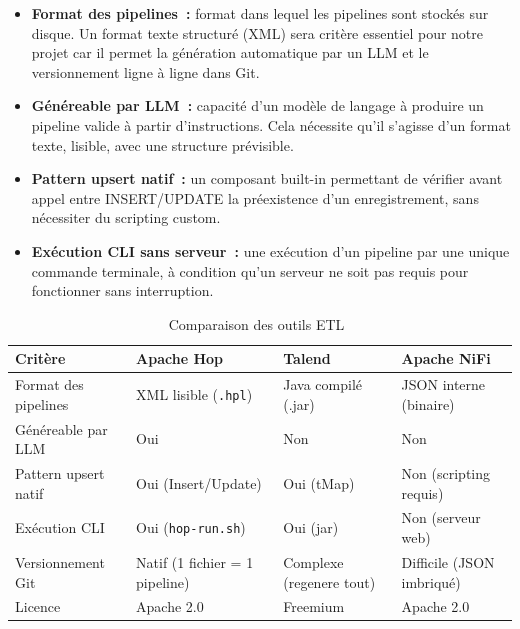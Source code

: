 \begin{itemize}
    \item \textbf{Format des pipelines~:} format dans lequel les pipelines sont stockés sur disque. Un format texte structuré (XML) sera critère essentiel pour notre projet car il permet la génération automatique par un LLM et le versionnement ligne à ligne dans Git.
    \item \textbf{Généreable par LLM~:} capacité d'un modèle de langage à produire un pipeline valide à partir d'instructions. Cela nécessite qu'il s'agisse d'un format texte, lisible, avec une structure prévisible.
    \item \textbf{Pattern upsert natif~:} un composant built-in permettant de vérifier avant appel entre INSERT/UPDATE la préexistence d'un enregistrement, sans nécessiter du scripting custom.
    \item \textbf{Exécution CLI sans serveur~:} une exécution d'un pipeline par une unique commande terminale, à condition qu'un serveur ne soit pas requis pour fonctionner sans interruption.
\end{itemize}

\begin{table}[H]
  \centering
  \renewcommand{\arraystretch}{1.4}
  \begin{tabular}{p{3.5cm} p{3.2cm} p{3.2cm} p{3.2cm}}
    \toprule
    \rowcolor{gray!20}
    \textbf{Critère} & \textbf{Apache Hop} & \textbf{Talend} & \textbf{Apache NiFi} \\
    \midrule
    \rowcolor{gray!5}
    Format des pipelines & XML lisible (\texttt{.hpl}) & Java compilé (.jar) & JSON interne (binaire) \\
    Généreable par LLM   & Oui              & Non                & Non \\
    \rowcolor{gray!5}
    Pattern upsert natif & Oui (Insert/Update) & Oui (tMap)      & Non (scripting requis) \\
    Exécution CLI        & Oui (\texttt{hop-run.sh}) & Oui (jar)  & Non (serveur web) \\
    \rowcolor{gray!5}
    Versionnement Git    & Natif (1 fichier = 1 pipeline) & Complexe (regenere tout) & Difficile (JSON imbriqué) \\
    Licence              & Apache 2.0       & Freemium           & Apache 2.0 \\
    \bottomrule
  \end{tabular}
  \caption{Comparaison des outils ETL~\cite{hop-doc,talend-doc,nifi-doc}}
  \label{tab:benchmark-etl}
\end{table}

